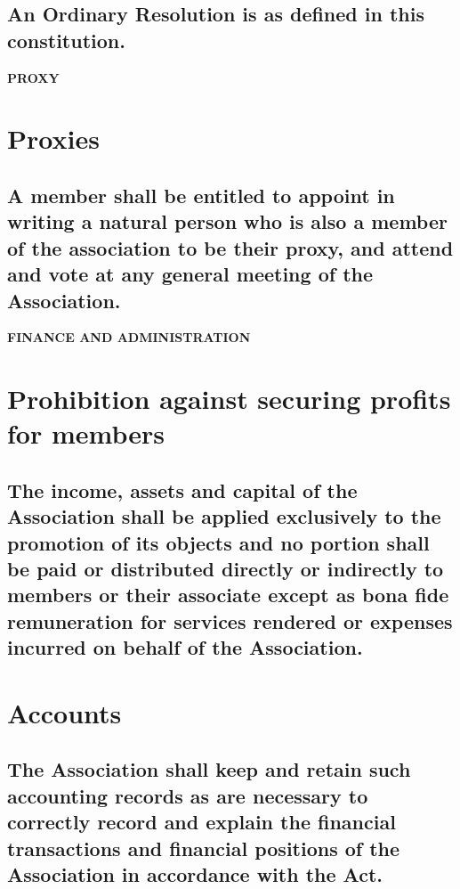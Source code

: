 \documentclass{article}
\newenvironment{subs}
  {\adjustwidth{2em}{0pt}}
  {\endadjustwidth}
\begin{document}
\begin{subs}
\begin{subs}
\begin{subs}
\subsection{An Ordinary Resolution is as defined in this constitution.}
\end{subs}

\vspace{5mm}
{\large\bf PROXY\par}
\hrulefill
\vspace{5mm}

\section{Proxies}
\begin{subs}
\subsection{A member shall be entitled to appoint in writing a natural person who is also a member of the association to be their proxy, and attend and vote at any general meeting of the Association.}
\end{subs}

\vspace{5mm}
{\large\bf FINANCE AND ADMINISTRATION\par}
\hrulefill
\vspace{5mm}

\section{Prohibition against securing profits for members}
\begin{subs}
\subsection{The income, assets and capital of the Association shall be applied exclusively to the promotion of its objects and no portion shall be paid or distributed directly or indirectly to members or their associate except as bona fide remuneration for services rendered or expenses incurred on behalf of the Association.}
\end{subs}


\section{Accounts}
\begin{subs}
\subsection{The Association shall keep and retain such accounting records as are necessary to correctly record and explain the financial transactions and financial positions of the Association in accordance with the Act.}

\end{subs}
\end{subs}
\end{subs}
\end{document}
